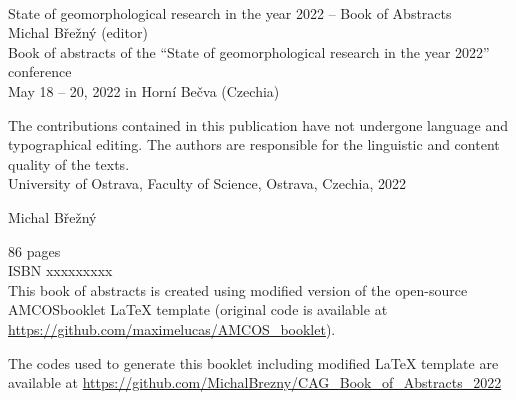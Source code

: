 \documentclass[
	openany, %
	parskip=false, %
	12pt, %
	a4paper, %
]{conferencebooklet} %
\begin{document}


\cleardoublepage
\setcounter{page}{1}
\thispagestyle{empty} %

~\vfill %


\begin{flushleft}	
\vspace{2em}
State of geomorphological research in the year 2022 -- Book of Abstracts\\
Michal Břežný (editor)\\
\vspace{2em}
Book of abstracts of the \enquote{State of geomorphological research in the year 2022} conference\\
May 18 – 20, 2022 in Horní Bečva (Czechia)\\
\vspace{2em}

The contributions contained in this publication have not undergone language and typographical editing. The authors are responsible for the linguistic and content quality of the texts.
\\ 
\vspace{2em}
University of Ostrava, Faculty of Science,
Ostrava, Czechia, 2022 \\\vspace{2em}

 Michal Břežný

86 pages\\
\vspace{1em}
ISBN xxxxxxxxx\\

\vspace{5em}
This book of abstracts is created using  modified version of the open-source AMCOS\textunderscore booklet \LaTeX{} template (original code is available at  \url{https://github.com/maximelucas/AMCOS\_booklet}).

The codes used to generate this booklet including modified \LaTeX{} template are available at \url{https://github.com/MichalBrezny/CAG_Book_of_Abstracts_2022}

\end{flushleft}
\end{document}
